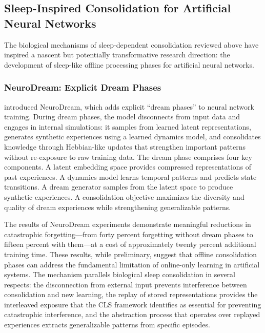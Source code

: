 \documentclass[11pt,letterpaper]{article}
\begin{document}
\subsection{Sleep-Inspired Consolidation for Artificial Neural Networks}

The biological mechanisms of sleep-dependent consolidation reviewed above have inspired a nascent but potentially transformative research direction: the development of sleep-like offline processing phases for artificial neural networks.

\subsubsection{NeuroDream: Explicit Dream Phases}

\cite{tutuncuoglu2024neurodream} introduced NeuroDream, which adds explicit ``dream phases'' to neural network training. During dream phases, the model disconnects from input data and engages in internal simulations: it samples from learned latent representations, generates synthetic experiences using a learned dynamics model, and consolidates knowledge through Hebbian-like updates that strengthen important patterns without re-exposure to raw training data. The dream phase comprises four key components. A latent embedding space provides compressed representations of past experiences. A dynamics model learns temporal patterns and predicts state transitions. A dream generator samples from the latent space to produce synthetic experiences. A consolidation objective maximizes the diversity and quality of dream experiences while strengthening generalizable patterns.

The results of NeuroDream experiments demonstrate meaningful reductions in catastrophic forgetting---from forty percent forgetting without dream phases to fifteen percent with them---at a cost of approximately twenty percent additional training time. These results, while preliminary, suggest that offline consolidation phases can address the fundamental limitation of online-only learning in artificial systems. The mechanism parallels biological sleep consolidation in several respects: the disconnection from external input prevents interference between consolidation and new learning, the replay of stored representations provides the interleaved exposure that the CLS framework identifies as essential for preventing catastrophic interference, and the abstraction process that operates over replayed experiences extracts generalizable patterns from specific episodes.
\end{document}
